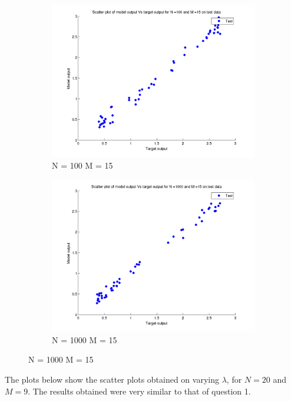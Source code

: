 \documentclass{article}
\begin{document}
\begin{figure}[H]

\begin{subfigure}{.5\textwidth}
\centering
\includegraphics[width=\linewidth]{Scatter_1/VaryingN_N100M15_test}
\caption{N = 100 M = 15}
\end{subfigure}
\begin{subfigure}{.5\textwidth}
\includegraphics[width=\linewidth]{Scatter_1/VaryingN_N1000M15_test}
\caption{N = 1000 M = 15}
\end{subfigure}

\end{figure}



The plots below show the scatter plots obtained on varying $\lambda$, for $N = 20$ and $M = 9$. The results obtained were very similar to that of question 1.\newline
\end{document}
